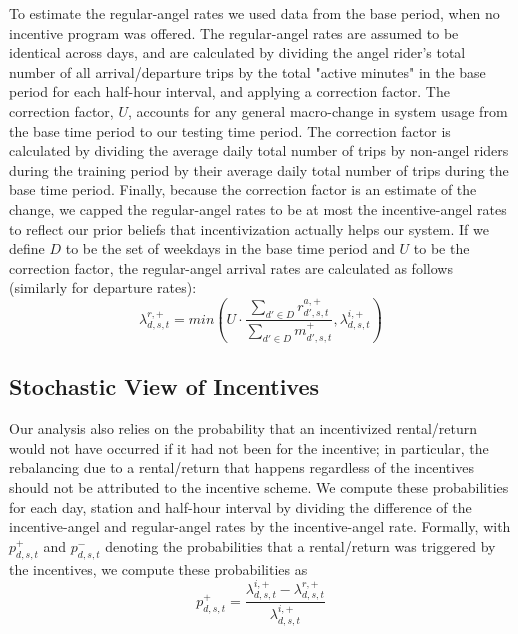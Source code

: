 

To estimate the regular-angel rates we used data from the base period, when no incentive program was offered. The regular-angel rates are assumed to be identical across days, and are calculated by dividing the angel rider's total number of all arrival/departure trips by the total "active minutes" in the base period for each half-hour interval, and applying a correction factor. The correction factor, $U$,  accounts for any general macro-change in system usage from the base time period to our testing time period. The correction factor is calculated by dividing the average daily total number of trips by non-angel riders during the training period by their average daily total number of trips during the  base time period. Finally, because the correction factor is an estimate of the change, we capped the regular-angel rates to be at most the incentive-angel rates to reflect our prior beliefs that incentivization actually helps our system. If we define $D$ to be the set of weekdays in the base time period and $U$ to be the correction factor, the regular-angel arrival rates are calculated as follows (similarly for departure rates):
\begin{equation}
\lambda_{d, s, t}^{r, +} = min(U \cdot  \frac{ \sum_{d' \in D} r_{d',s,t}^{a, +}}{ \sum_{d' \in D} m_{d',s,t}^+} , \lambda_{d,s,t}^{i, +} ) 
\end{equation}

\subsection{Stochastic View of Incentives}
Our analysis also relies on the probability that an incentivized rental/return would not have occurred if it had not been for the incentive; in particular, the rebalancing due to a rental/return that happens regardless of the incentives should not be attributed to the incentive scheme. We compute these probabilities for each day, station and half-hour interval by %
dividing the difference of the incentive-angel and regular-angel rates by the incentive-angel rate. Formally, with $p_{d, s, t}^+$ and $p_{d, s, t}^-$ denoting the probabilities that a rental/return was triggered by the incentives, we compute these probabilities as %
\begin{equation}
 p^+_{d, s, t} =  \frac{\lambda_{d, s, t}^{i, +} - \lambda_{d, s, t}^{r, +} }{\lambda_{d, s, t}^{i, +}}
 \end{equation}

